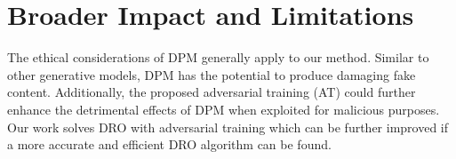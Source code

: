 \section*{Broader Impact and Limitations}
The ethical considerations of DPM generally apply to our method. Similar to other generative models, DPM has the potential to produce damaging fake content. Additionally, the proposed adversarial training (AT) could further enhance the detrimental effects of DPM when exploited for malicious purposes. Our work solves DRO with adversarial training which can be further improved if a more accurate and efficient DRO algorithm can be found.